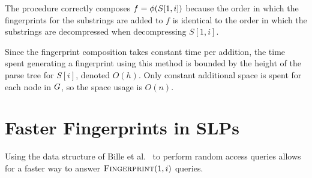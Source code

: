 


The procedure correctly composes $f = \phi(S[1, i])$ because the order in which the fingerprints for the substrings are added to $f$ is identical to the order in which the substrings are decompressed when decompressing $S[1, i]$. 

Since the fingerprint composition takes constant time per addition, the time spent generating a fingerprint using this method is bounded by the height of the parse tree for $S[i]$, denoted $O(h)$. Only constant additional space is spent for each node in $G$, so the space usage is $O(n)$.

\section{Faster Fingerprints in SLPs}
Using the data structure of Bille et al.~\cite{bille2011random} to perform random access queries allows for a faster way to answer $\textsc{Fingerprint}(1, i)$ queries.

